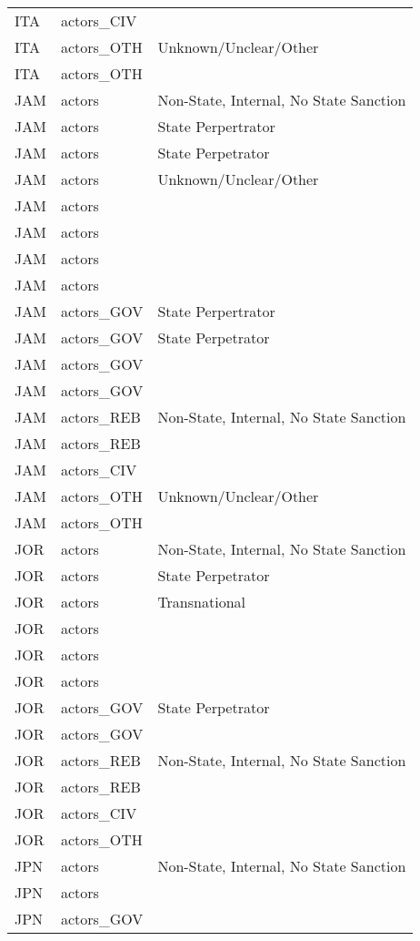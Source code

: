 \begin{table}[ht]
\begin{tabular}{lll}
  ITA & actors\_CIV &  \\ 
  ITA & actors\_OTH & Unknown/Unclear/Other \\ 
  ITA & actors\_OTH &  \\ 
  JAM & actors & Non-State, Internal, No State Sanction \\ 
  JAM & actors & State Perpertrator \\ 
  JAM & actors & State Perpetrator \\ 
  JAM & actors & Unknown/Unclear/Other \\ 
  JAM & actors &  \\ 
  JAM & actors &  \\ 
  JAM & actors &  \\ 
  JAM & actors &  \\ 
  JAM & actors\_GOV & State Perpertrator \\ 
  JAM & actors\_GOV & State Perpetrator \\ 
  JAM & actors\_GOV &  \\ 
  JAM & actors\_GOV &  \\ 
  JAM & actors\_REB & Non-State, Internal, No State Sanction \\ 
  JAM & actors\_REB &  \\ 
  JAM & actors\_CIV &  \\ 
  JAM & actors\_OTH & Unknown/Unclear/Other \\ 
  JAM & actors\_OTH &  \\ 
  JOR & actors & Non-State, Internal, No State Sanction \\ 
  JOR & actors & State Perpetrator \\ 
  JOR & actors & Transnational \\ 
  JOR & actors &  \\ 
  JOR & actors &  \\ 
  JOR & actors &  \\ 
  JOR & actors\_GOV & State Perpetrator \\ 
  JOR & actors\_GOV &  \\ 
  JOR & actors\_REB & Non-State, Internal, No State Sanction \\ 
  JOR & actors\_REB &  \\ 
  JOR & actors\_CIV &  \\ 
  JOR & actors\_OTH &  \\ 
  JPN & actors & Non-State, Internal, No State Sanction \\ 
  JPN & actors &  \\ 
  JPN & actors\_GOV &  \\ 

\end{tabular}
\end{table}
